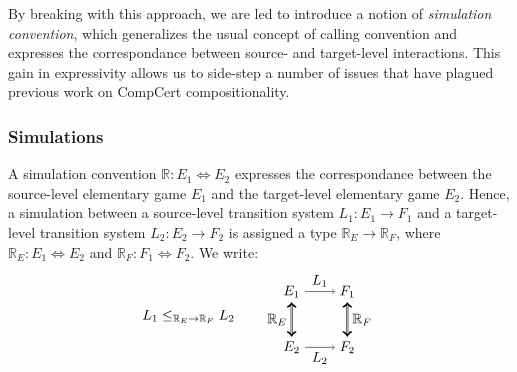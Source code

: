 \documentclass[sigplan,10pt,review,anonymous]{acmart}
\begin{document}
By breaking with this approach,
we are led to introduce a notion of \emph{simulation convention},
which generalizes the usual concept of calling convention
and expresses the correspondance between
source- and target-level interactions.
This gain in expressivity
allows us to side-step a number of issues
that have plagued previous work on CompCert compositionality.


\subsubsection{Simulations} %

A simulation convention $\mathbb{R} : E_1 \Leftrightarrow E_2$
expresses the correspondance between
the source-level elementary game $E_1$ and
the target-level elementary game $E_2$.
Hence,
a simulation between
a source-level transition system $L_1 : E_1 \rightarrow F_1$ and
a target-level transition system $L_2 : E_2 \rightarrow F_2$ 
is assigned a type $\mathbb{R}_E \rightarrow \mathbb{R}_F$,
where
$\mathbb{R}_E : E_1 \Leftrightarrow E_2$ and
$\mathbb{R}_F : F_1 \Leftrightarrow F_2$.
We write:
\[
  L_1 \le_{\mathbb{R}_E \rightarrow \mathbb{R}_F} L_2 \qquad
  \begin{tikzpicture}[baseline,scale=0.7]
    \node (A1) at (-1,  1) {$E_1$};
    \node (A2) at (-1, -1) {$E_2$};
    \node (B1) at ( 1,  1) {$F_1$};
    \node (B2) at ( 1, -1) {$F_2$};
    \draw (A1) edge[->] node[auto] {$L_1$} (B1);
    \draw (A2) edge[->] node[auto,swap] {$L_2$} (B2);
    \draw (A1) edge[<->, double] node[auto,swap] {$\mathbb{R}_E$} (A2);
    \draw (B1) edge[<->, double] node[auto] {$\mathbb{R}_F$} (B2);
  \end{tikzpicture}
\]
\end{document}
